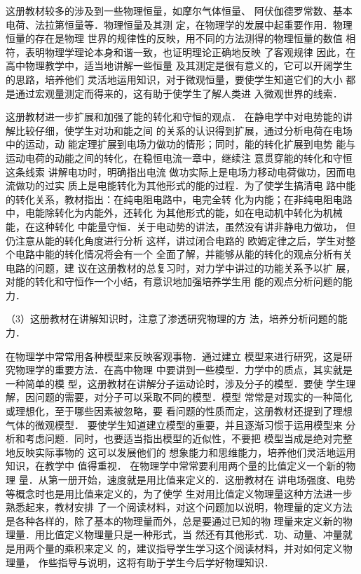 这册教材较多的涉及到一些物理恒量，如摩尔气体恒量、
阿伏伽德罗常数、基本电荷、法拉第恒量等．物理恒量及其测
定，在物理学的发展中起重要作用．物理恒量的存在是物理
世界的规律性的反映，用不同的方法测得的物理恒量的数值
相符，表明物理学理论本身和谐一致，也证明理论正确地反映
了客观规律 因此，在高中物理教学中，适当地讲解一些恒量
及其测定是很有意义的，它可以开阔学生的思路，培养他们
灵活地运用知识，对于微观恒量，要使学生知道它们的大小
都是通过宏观量测定而得来的，这有助于使学生了解人类进
入微观世界的线索．

这册教材进一步扩展和加强了能的转化和守恒的观点．
在静电学中对电势能的讲解比较仔细，使学生对功和能之间
的关系的认识得到扩展，通过分析电荷在电场中的运动，动
能定理扩展到电场力做功的情形；同时，能的转化扩展到电势
能与运动电荷的动能之间的转化，在稳恒电流一章中，继续注
意贯穿能的转化和守恒这条线索 讲解电功时，明确指出电流
做功实际上是电场力移动电荷做功，因而电流做功的过实
质上是电能转化为其他形式的能的过程．为了使学生搞清电
路中能的转化关系，教材指出：在纯电阻电路中，电完全转
化为内能；在非纯电阻电路中，电能除转化为内能外，还转化
为其他形式的能，如在电动机中转化为机械能，在这种转化
中能量守恒．关于电动势的讲法，虽然没有讲非静电力做功，
但仍注意从能的转化角度进行分析 这样，讲过闭合电路的
欧姆定律之后，学生对整个电路中能的转化情况将会有一个
全面了解，并能够从能的转化的观点分析有关电路的问题，建
议在这册教材的总复习时，对力学中讲过的功能关系予以扩
展，对能的转化和守恒作一个小结，有意识地加强培养学生用
能的观点分析问题的能力．

（3）这册教材在讲解知识时，注意了渗透研究物理的方
法，培养分析问题的能力．

在物理学中常常用各种模型来反映客观事物．通过建立
模型来进行研究，这是研究物理学的重要方法．在高中物理
中要讲到一些模型．力学中的质点，其实就是一种简单的模
型，这册教材在讲解分子运动论时，涉及分子的模型．要使
学生理解，因问题的需要，对分子可以采取不同的模型．模型
常常是对现实的一种简化或理想化，至于哪些因素被忽略，要
看问题的性质而定，这册教材还提到了理想气体的微观模型．
要使学生知道建立模型的重要，并且逐渐习惯于运用模型来
分析和考虑问题．同时，也要适当指出模型的近似性，不要把
模型当成是绝对完整地反映实际事物的 这可以发展他们的
想象能力和思维能力，培养他们灵活地运用知识，在教学中
值得重视．
在物理学中常常要利用两个量的比值定义一个新的物理
量．从第一册开始，速度就是用比值来定义的．这册教材在
讲电场强度、电势等概念时也是用比值来定义的，为了使学
生对用比值定义物理量这种方法进一步熟悉起来，教材安排
了一个阅读材料，对这个问题加以说明，物理量的定义方法
是各种各样的，除了基本的物理量而外，总是要通过已知的物
理量来定义新的物理量．用比值定义物理量只是一种形式，当
然还有其他形式．功、动量、冲量就是用两个量的乘积来定义
的，建议指导学生学习这个阅读材料，并对如何定义物理量，
作些指导与说明，这将有助于学生今后学好物理知识．


